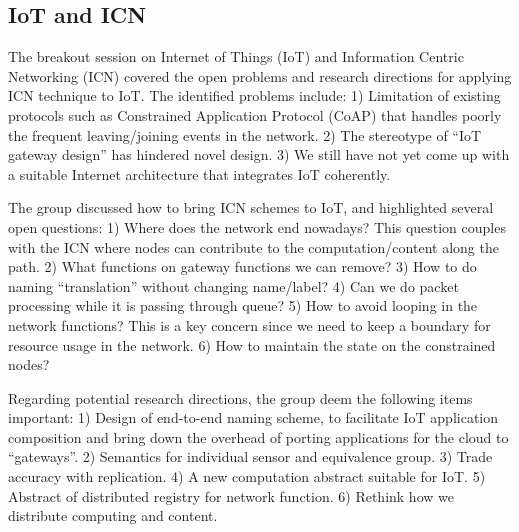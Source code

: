 \subsection{IoT and ICN}

The breakout session on Internet of Things (IoT) and Information Centric
Networking (ICN) covered the open problems and research directions for
applying ICN technique to IoT. The identified problems include: 1) Limitation
of existing protocols such as Constrained Application Protocol (CoAP) that
handles poorly the frequent leaving/joining events in the network. 2) The
stereotype of ``IoT gateway design'' has hindered novel design. 3) We still
have not yet come up with a suitable Internet architecture that integrates
IoT coherently.

The group discussed how to bring ICN schemes to IoT, and highlighted several
open questions: 1) Where does the network end nowadays? This question couples
with the ICN where nodes can contribute to the computation/content along
the path. 2) What functions on gateway functions we can remove? 3) How to do
naming ``translation'' without changing name/label? 4) Can we do packet
processing while it is passing through queue? 5) How to avoid looping in
the network functions? This is a key concern since we need to keep a
boundary for resource usage in the network. 6) How to maintain the state on
the constrained nodes?

Regarding potential research directions, the group deem the following items
important: 1) Design of end-to-end naming scheme, to facilitate IoT
application composition and bring down the overhead of porting applications
for the cloud to ``gateways''. 2) Semantics for individual sensor and
equivalence group. 3) Trade accuracy with replication. 4) A new computation
abstract suitable for IoT. 5) Abstract of distributed registry for network
function. 6) Rethink how we distribute computing and content.
